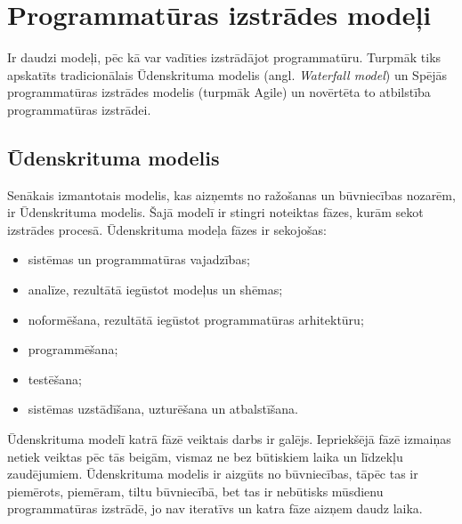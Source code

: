\chapter{Programmatūras izstrādes modeļi}
Ir daudzi modeļi, pēc kā var vadīties izstrādājot programmatūru. Turpmāk tiks apskatīts tradicionālais Ūdenskrituma modelis (angl. \textit{Waterfall model}) un Spējās programmatūras izstrādes modelis (turpmāk Agile)  un novērtēta to atbilstība programmatūras izstrādei.
\section{Ūdenskrituma modelis}
Senākais izmantotais modelis, kas aizņemts no ražošanas un būvniecības nozarēm, ir Ūdenskrituma modelis. Šajā modelī ir stingri noteiktas fāzes, kurām sekot izstrādes procesā.
Ūdenskrituma modeļa fāzes ir sekojošas:
\begin{itemize}
	\item sistēmas un programmatūras vajadzības;
	\item analīze, rezultātā iegūstot modeļus un shēmas;
	\item noformēšana, rezultātā iegūstot programmatūras arhitektūru;
	\item programmēšana;
	\item testēšana;
	\item sistēmas uzstādīšana, uzturēšana un atbalstīšana.
\end{itemize}
Ūdenskrituma modelī katrā fāzē veiktais darbs ir galējs. Iepriekšējā fāzē izmaiņas netiek veiktas pēc tās beigām, vismaz ne bez būtiskiem laika un līdzekļu zaudējumiem.
Ūdenskrituma modelis ir aizgūts no būvniecības, tāpēc tas ir piemērots, piemēram, tiltu būvniecībā, bet tas ir nebūtisks mūsdienu programmatūras izstrādē, jo nav iteratīvs un katra fāze aizņem daudz laika.


